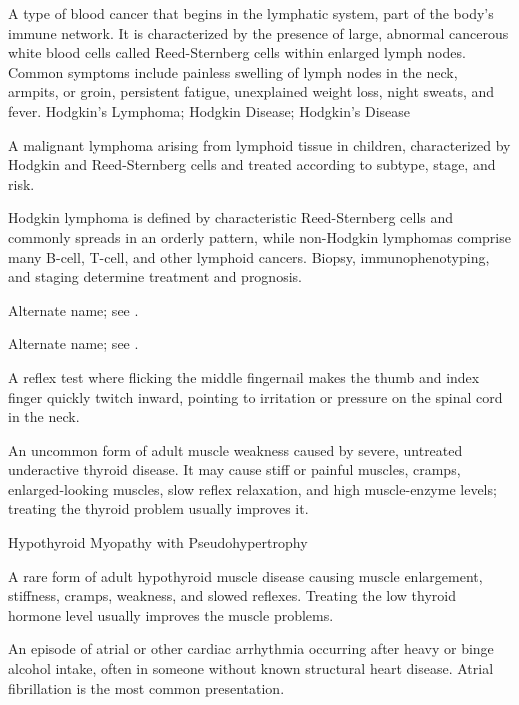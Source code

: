  A type of blood cancer that begins in the lymphatic system, part of the body's immune network. It is characterized by the presence of large, abnormal cancerous white blood cells called Reed-Sternberg cells within enlarged lymph nodes. Common symptoms include painless swelling of lymph nodes in the neck, armpits, or groin, persistent fatigue, unexplained weight loss, night sweats, and fever.
\synonyms
Hodgkin's Lymphoma; Hodgkin Disease; Hodgkin's Disease

 A malignant lymphoma arising from lymphoid tissue in children, characterized by Hodgkin and Reed-Sternberg cells and treated according to subtype, stage, and risk.

 Hodgkin lymphoma is defined by characteristic Reed-Sternberg cells and commonly spreads in an orderly pattern, while non-Hodgkin lymphomas comprise many B-cell, T-cell, and other lymphoid cancers. Biopsy, immunophenotyping, and staging determine treatment and prognosis.

 Alternate name; see .

 Alternate name; see .

 A reflex test where flicking the middle fingernail makes the thumb and index finger quickly twitch inward, pointing to irritation or pressure on the spinal cord in the neck.

 An uncommon form of adult muscle weakness caused by severe, untreated underactive thyroid disease. It may cause stiff or painful muscles, cramps, enlarged-looking muscles, slow reflex relaxation, and high muscle-enzyme levels; treating the thyroid problem usually improves it.

\synonyms
Hypothyroid Myopathy with Pseudohypertrophy

 A rare form of adult hypothyroid muscle disease causing muscle enlargement, stiffness, cramps, weakness, and slowed reflexes. Treating the low thyroid hormone level usually improves the muscle problems.

 An episode of atrial or other cardiac arrhythmia occurring after heavy or binge alcohol intake, often in someone without known structural heart disease. Atrial fibrillation is the most common presentation.

